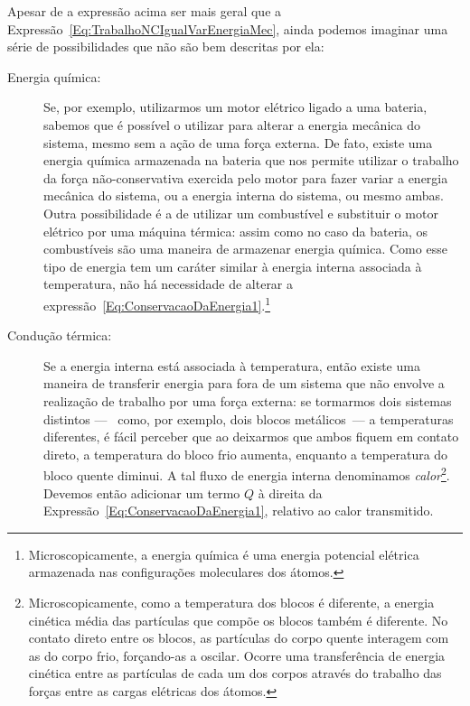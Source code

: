Apesar de a expressão acima ser mais geral que a Expressão~\eqref{Eq:TrabalhoNCIgualVarEnergiaMec}, ainda podemos imaginar uma série de possibilidades que não são bem descritas por ela:
\begin{description}
    \item[Energia química:] Se, por exemplo, utilizarmos um motor elétrico ligado a uma bateria, sabemos que é possível o utilizar para alterar a energia mecânica do sistema, mesmo sem a ação de uma força externa. De fato, existe uma energia química armazenada na bateria que nos permite utilizar o trabalho da força não-conservativa exercida pelo motor para fazer variar a energia mecânica do sistema, ou a energia interna do sistema, ou mesmo ambas. Outra possibilidade é a de utilizar um combustível e substituir o motor elétrico por uma máquina térmica: assim como no caso da bateria, os combustíveis são uma maneira de armazenar energia química. Como esse tipo de energia tem um caráter similar à energia interna associada à temperatura, não há necessidade de alterar a expressão~\eqref{Eq:ConservacaoDaEnergia1}.\footnote{Microscopicamente, a energia química é uma energia potencial elétrica armazenada nas configurações moleculares dos átomos.}
    
    \item[Condução térmica:] Se a energia interna está associada à temperatura, então existe uma maneira de transferir energia para fora de um sistema que não envolve a realização de trabalho por uma força externa: se tormarmos dois sistemas distintos ---~ como, por exemplo, dois blocos metálicos~--- a temperaturas diferentes, é fácil perceber que ao deixarmos que ambos fiquem em contato direto, a temperatura do bloco frio aumenta, enquanto a temperatura do bloco quente diminui. A tal fluxo de energia interna denominamos \emph{calor}\footnote{Microscopicamente, como a temperatura dos blocos é diferente, a energia cinética média das partículas que compõe os blocos também é diferente. No contato direto entre os blocos, as partículas do corpo quente interagem com as do corpo frio, forçando-as a oscilar. Ocorre uma transferência de energia cinética entre as partículas de cada um dos corpos através do trabalho das forças entre as cargas elétricas dos átomos.}. Devemos então adicionar um termo $Q$ à direita da Expressão~\eqref{Eq:ConservacaoDaEnergia1}, relativo ao calor transmitido.


\end{description}

